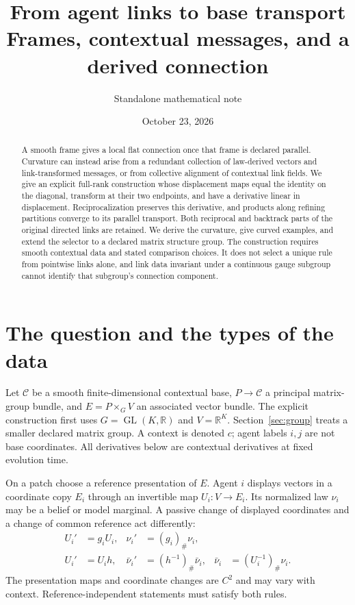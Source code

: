 \documentclass[11pt]{article}
\title{From agent links to base transport\\\large Frames, contextual messages, and a derived connection}
\author{Standalone mathematical note}
\date{October 23, 2026}
\newcommand{\R}{\mathbb R}
\newcommand{\GL}{\operatorname{GL}}
\newcommand{\C}{\mathcal C}
\begin{document}
\maketitle
\begin{abstract}
A smooth frame gives a local flat connection once that frame is declared parallel. Curvature can instead arise from a redundant collection of law-derived vectors and link-transformed messages, or from collective alignment of contextual link fields. We give an explicit full-rank construction whose displacement maps equal the identity on the diagonal, transform at their two endpoints, and have a derivative linear in displacement. Reciprocalization preserves this derivative, and products along refining partitions converge to its parallel transport. Both reciprocal and backtrack parts of the original directed links are retained. We derive the curvature, give curved examples, and extend the selector to a declared matrix structure group. The construction requires smooth contextual data and stated comparison choices. It does not select a unique rule from pointwise links alone, and link data invariant under a continuous gauge subgroup cannot identify that subgroup's connection component.
\end{abstract}

\section{The question and the types of the data}

Let $\C$ be a smooth finite-dimensional contextual base, $P\to\C$ a principal matrix-group bundle, and $E=P\times_G V$ an associated vector bundle. The explicit construction first uses $G=\GL(K,\R)$ and $V=\R^K$. Section~\ref{sec:group} treats a smaller declared matrix group. A context is denoted $c$; agent labels $i,j$ are not base coordinates. All derivatives below are contextual derivatives at fixed evolution time.

On a patch choose a reference presentation of $E$. Agent $i$ displays vectors in a coordinate copy $E_i$ through an invertible map $U_i:V\to E_i$. Its normalized law $\nu_i$ may be a belief or model marginal. A passive change of displayed coordinates and a change of common reference act differently:
\begin{align}
 U_i'&=g_iU_i,&\nu_i'&=(g_i)_\#\nu_i,
 \label{eq:passive}\\
 U_i'&=U_i h,&\bar\nu_i'&=(h^{-1})_\#\bar\nu_i,
 &\bar\nu_i&=(U_i^{-1})_\#\nu_i.
 \label{eq:reference}
\end{align}
The presentation maps and coordinate changes are $C^2$ and may vary with context. Reference-independent statements must satisfy both rules.
\end{document}
